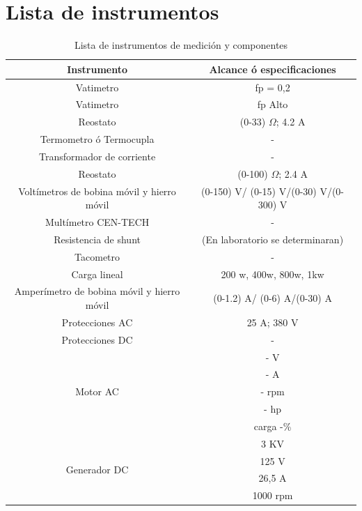 \documentclass[11pt,letterpaper]{article}     %
\begin{document}
\section{Lista de instrumentos}
\begin{table}[H]
	\caption{Lista de instrumentos de medición y componentes}
	\centering
	\begin{tabular}{|c|c|}
		\hline 
		Instrumento & Alcance ó especificaciones \\ \hline 
		Vatimetro &  fp = 0,2 \\  
		\hline 
		Vatimetro &  fp Alto\\  
		\hline 
		Reostato &  (0-33) $\Omega$; 4.2 A \\  
		\hline
		Termometro ó Termocupla &  - \\  
		\hline
		Transformador de corriente &  - \\  
		\hline
		Reostato &  (0-100) $\Omega$; 2.4 A \\  
		\hline
		Voltímetros de bobina móvil y hierro móvil &  (0-150) V/ (0-15) V/(0-30) V/(0-300) V\\  
		\hline 
		Multímetro CEN-TECH & -\\  
		\hline 
		Resistencia de shunt & (En laboratorio se determinaran)\\  
		\hline
		Tacometro & -\\  
		\hline
		Carga lineal & 200 w, 400w, 800w, 1kw\\  
		\hline
		Amperímetro de bobina móvil y hierro móvil &(0-1.2) A/ (0-6) A/(0-30) A \\ 
		\hline
		Protecciones AC & 25 A; 380 V\\ 
		\hline
		Protecciones DC & -\\ 
		\hline
		\multirow{5}{3cm}{Motor AC} & - V \\ 
		\cline{2-2}
		& - A  \\
		\cline{2-2}
		& - rpm\\
		\cline{2-2}
		&- hp\\
		\cline{2-2}
		&carga -\%\\
		\hline
		\multirow{5}{3cm}{Generador DC} & 3 KV\\ 
		\cline{2-2}
		& 125 V \\
		\cline{2-2}
		&26,5 A\\
		\cline{2-2}
		& 1000 rpm\\
		\hline
		
		
	\end{tabular} 
\end{table}
\end{document}
